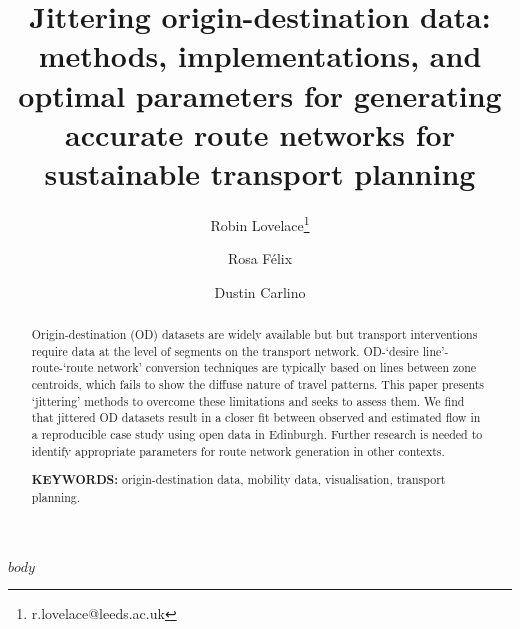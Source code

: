 \documentclass[11pt]{article}
\title{Jittering origin-destination data: methods, implementations, and optimal parameters for generating accurate route networks for sustainable transport planning}
\author[1]{Robin Lovelace\thanks{r.lovelace@leeds.ac.uk}}
\author[2]{Rosa Félix}
\author[3]{Dustin Carlino}
\affil[1]{University of Leeds}
\affil[2]{University of Lisbon}
\affil[3]{Alan Turing Institute, London}
\begin{document}
\maketitle


\begin{abstract}
\centering


Origin-destination (OD) datasets are widely available but but transport interventions require data at the level of segments on the transport network.
OD-`desire line'-route-`route network' conversion techniques are typically based on lines between zone centroids, which fails to show the diffuse nature of travel patterns.
This paper presents `jittering' methods to overcome these limitations and seeks to assess them.
We find that jittered OD datasets result in a closer fit between observed and estimated flow in a reproducible case study using open data in Edinburgh.
Further research is needed to identify appropriate parameters for route network generation in other contexts.

{\bf KEYWORDS:} origin-destination data, mobility data, visualisation, transport planning.

\end{abstract}


$body$
\end{document}
